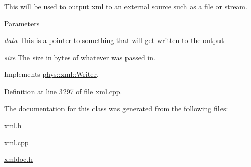 This will be used to output xml to an external source such as a file or stream. 


\begin{DoxyParams}{Parameters}
\item[{\em data}]This is a pointer to something that will get written to the output \item[{\em size}]The size in bytes of whatever was passed in. \end{DoxyParams}


Implements \hyperlink{classphys_1_1xml_1_1Writer_ab6d4758ab53743f236eb64d5b2dd7e9e}{phys::xml::Writer}.



Definition at line 3297 of file xml.cpp.



The documentation for this class was generated from the following files:\begin{DoxyCompactItemize}
\item 
\hyperlink{xml_8h}{xml.h}\item 
xml.cpp\item 
\hyperlink{xmldoc_8h}{xmldoc.h}\end{DoxyCompactItemize}
